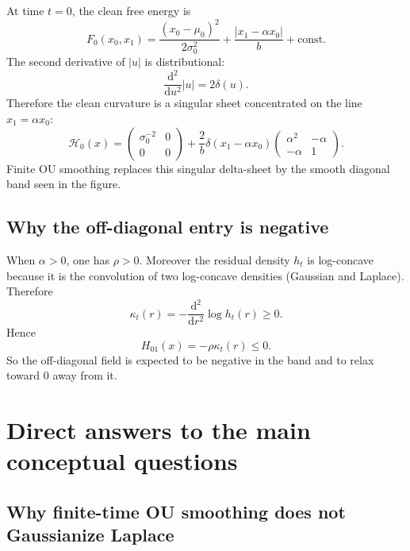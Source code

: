 \documentclass[11pt]{article}
\newcommand{\dd}{\mathrm{d}}
\newcommand{\1}{\mathbf{1}}
\newcommand{\curv}{\mathcal{H}}
\theoremstyle{definition}
\begin{document}
At time \(t=0\), the clean free energy is
\begin{equation}
F_0(x_0,x_1)=\frac{(x_0-\mu_0)^2}{2\sigma_0^2}+\frac{|x_1-\alpha x_0|}{b}+\text{const}.
\end{equation}
The second derivative of \(|u|\) is distributional:
\begin{equation}
\frac{\dd^2}{\dd u^2}|u| = 2\delta(u).
\end{equation}
Therefore the clean curvature is a singular sheet concentrated on the line \(x_1=\alpha x_0\):
\begin{equation}
\curv_0(x)
=
\begin{pmatrix}
\sigma_0^{-2} & 0\\[0.4em]
0 & 0
\end{pmatrix}
+
\frac{2}{b}\delta(x_1-\alpha x_0)
\begin{pmatrix}
\alpha^2 & -\alpha\\[0.3em]
-\alpha & 1
\end{pmatrix}.
\end{equation}
Finite OU smoothing replaces this singular delta-sheet by the smooth diagonal band seen in the figure.

\subsection{Why the off-diagonal entry is negative}

When \(\alpha>0\), one has \(\rho>0\). Moreover the residual density \(h_t\) is log-concave because it is the convolution of two log-concave densities (Gaussian and Laplace). Therefore
\begin{equation}
\kappa_t(r)=-\frac{\dd^2}{\dd r^2}\log h_t(r)\ge 0.
\end{equation}
Hence
\begin{equation}
H_{01}(x)=-\rho\kappa_t(r)\le 0.
\end{equation}
So the off-diagonal field is expected to be negative in the band and to relax toward \(0\) away from it.

\section{Direct answers to the main conceptual questions}

\subsection{Why finite-time OU smoothing does not Gaussianize Laplace}
\end{document}
